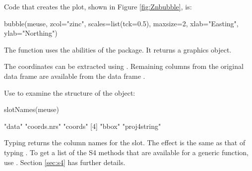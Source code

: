 Code that creates the plot, shown in Figure \ref{fig:Znbubble}, is:
\begin{Schunk}
\begin{Sinput}
bubble(meuse, zcol="zinc", scales=list(tck=0.5),
       maxsize=2, xlab="Easting", ylab="Northing")
\end{Sinput}
\end{Schunk}
\noindent
The function  uses the abilities of the 
package.  It returns a  graphics object.

The coordinates can be extracted using .
Remaining columns from the original data frame are available from the
data frame .

Use  to examine the structure of the object:
\begin{Schunk}
\begin{Sinput}
slotNames(meuse)
\end{Sinput}
\begin{Soutput}
[1] "data"        "coords.nrs"  "coords"     
[4] "bbox"        "proj4string"
\end{Soutput}
\end{Schunk}
  Typing  returns
the column names for the  slot.  The effect is the
same as that of typing .  To get a list of the
S4 methods that are available for a generic function, use
. Section \ref{sec:s4} has further details.


